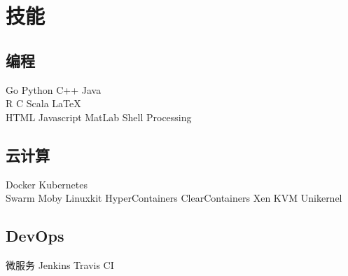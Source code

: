 \documentclass[]{deedy-resume-openfont}
\begin{document}
\begin{minipage}[t]{0.25\textwidth}


\section{技能}
\sectionsep
\subsection{编程}
Go \textbullet{} Python \textbullet{} C++ \textbullet{} Java \\
R \textbullet{} C \textbullet{} Scala \textbullet{} \LaTeX\ \\
HTML \textbullet{} Javascript \textbullet{} MatLab \textbullet{} Shell \textbullet{} Processing \\ 
\sectionsep

\subsection{云计算}
Docker \textbullet{} Kubernetes \\
Swarm \textbullet{} Moby \textbullet{} Linuxkit \textbullet{} HyperContainers \textbullet{} ClearContainers \textbullet{} Xen \textbullet{} KVM \textbullet{} Unikernel \\
\sectionsep

\subsection{DevOps}
微服务 \textbullet{} Jenkins \textbullet{} Travis CI

%
%

\end{minipage} 
\end{document}
